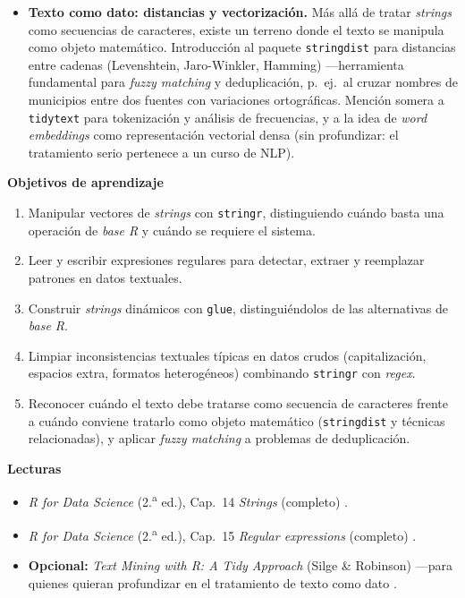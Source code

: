 \documentclass[11pt,letterpaper]{article}
\begin{document}
\begin{itemize}[leftmargin=*, itemsep=2pt]
    \item \textbf{Texto como dato: distancias y vectorización.} Más allá de tratar \textit{strings} como secuencias de caracteres, existe un terreno donde el texto se manipula como objeto matemático. Introducción al paquete \texttt{stringdist} para distancias entre cadenas (Levenshtein, Jaro-Winkler, Hamming) ---herramienta fundamental para \textit{fuzzy matching} y deduplicación, p.\ ej.\ al cruzar nombres de municipios entre dos fuentes con variaciones ortográficas. Mención somera a \texttt{tidytext} para tokenización y análisis de frecuencias, y a la idea de \textit{word embeddings} como representación vectorial densa (sin profundizar: el tratamiento serio pertenece a un curso de NLP).
\end{itemize}

\medskip
\noindent\textbf{Objetivos de aprendizaje}
\begin{enumerate}[leftmargin=*, itemsep=1pt]
    \item Manipular vectores de \textit{strings} con \texttt{stringr}, distinguiendo cuándo basta una operación de \textit{base R} y cuándo se requiere el sistema.
    \item Leer y escribir expresiones regulares para detectar, extraer y reemplazar patrones en datos textuales.
    \item Construir \textit{strings} dinámicos con \texttt{glue}, distinguiéndolos de las alternativas de \textit{base R}.
    \item Limpiar inconsistencias textuales típicas en datos crudos (capitalización, espacios extra, formatos heterogéneos) combinando \texttt{stringr} con \textit{regex}.
    \item Reconocer cuándo el texto debe tratarse como secuencia de caracteres frente a cuándo conviene tratarlo como objeto matemático (\texttt{stringdist} y técnicas relacionadas), y aplicar \textit{fuzzy matching} a problemas de deduplicación.
\end{enumerate}

\medskip
\noindent\textbf{Lecturas}
\begin{itemize}[leftmargin=*, itemsep=1pt]
    \item \textit{R for Data Science} (2.\textsuperscript{a} ed.), Cap.\ 14 \textit{Strings} (completo) \cite{wickham2023r4ds}.
    \item \textit{R for Data Science} (2.\textsuperscript{a} ed.), Cap.\ 15 \textit{Regular expressions} (completo) \cite{wickham2023r4ds}.
    \item \textbf{Opcional:} \textit{Text Mining with R: A Tidy Approach} (Silge \& Robinson) ---para quienes quieran profundizar en el tratamiento de texto como dato \cite{silge-tidytext}.
\end{itemize}
\end{document}
